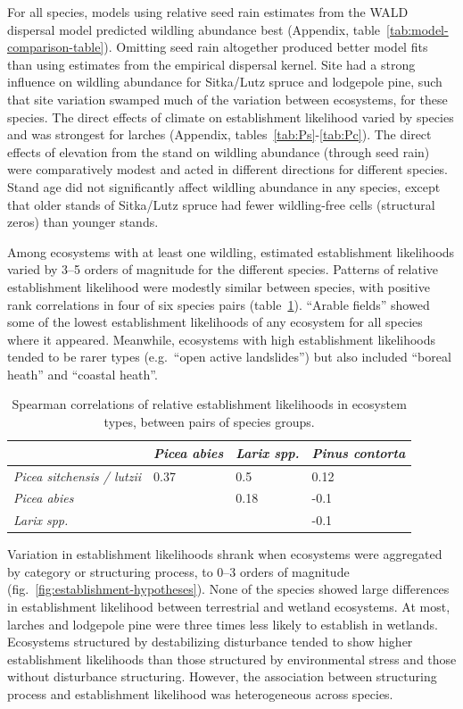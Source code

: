 \documentclass[
]{article}
\begin{document}
For all species, models using relative seed rain estimates from the WALD dispersal model predicted wildling abundance best (Appendix, table~\ref{tab:model-comparison-table}).
Omitting seed rain altogether produced better model fits than using estimates from the empirical dispersal kernel.
Site had a strong influence on wildling abundance for Sitka/Lutz spruce and lodgepole pine, such that site variation swamped much of the variation between ecosystems, for these species.
The direct effects of climate on establishment likelihood varied by species and was strongest for larches (Appendix, tables~\ref{tab:Ps}-\ref{tab:Pc}).
The direct effects of elevation from the stand on wildling abundance (through seed rain) were comparatively modest and acted in different directions for different species.
Stand age did not significantly affect wildling abundance in any species, except that older stands of Sitka/Lutz spruce had fewer wildling-free cells (structural zeros) than younger stands.

Among ecosystems with at least one wildling, estimated establishment likelihoods varied by 3--5 orders of magnitude for the different species.
Patterns of relative establishment likelihood were modestly similar between species, with positive rank correlations in four of six species pairs (table~\ref{tab:species-correlation-table}).
``Arable fields'' showed some of the lowest establishment likelihoods of any ecosystem for all species where it appeared.
Meanwhile, ecosystems with high establishment likelihoods tended to be rarer types (e.g.~``open active landslides'') but also included ``boreal heath'' and ``coastal heath''.

\begin{table}

\caption{\label{tab:species-correlation-table}Spearman correlations of relative establishment likelihoods in ecosystem types, between pairs of species groups.}
\centering
\begin{tabular}[t]{>{}llll}
\toprule
\em{ } & \em{Picea abies} & \em{Larix spp.} & \em{Pinus contorta}\\
\midrule
\em{Picea sitchensis / lutzii} & 0.37 & 0.5 & 0.12\\
\em{Picea abies} &  & 0.18 & -0.1\\
\em{Larix spp.} &  &  & -0.1\\
\bottomrule
\end{tabular}
\end{table}

Variation in establishment likelihoods shrank when ecosystems were aggregated by category or structuring process, to 0--3 orders of magnitude (fig.~\ref{fig:establishment-hypotheses}).
None of the species showed large differences in establishment likelihood between terrestrial and wetland ecosystems.
At most, larches and lodgepole pine were three times less likely to establish in wetlands.
Ecosystems structured by destabilizing disturbance tended to show higher establishment likelihoods than those structured by environmental stress and those without disturbance structuring.
However, the association between structuring process and establishment likelihood was heterogeneous across species.
\end{document}
